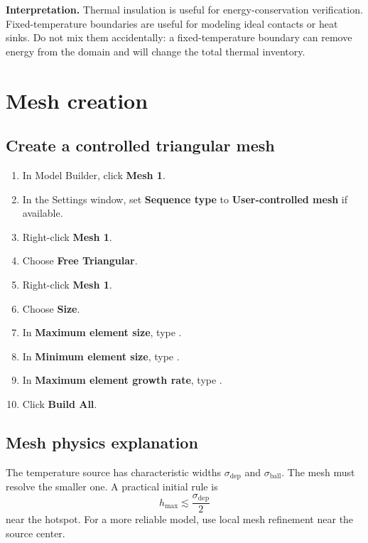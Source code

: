 \documentclass[11pt]{article}
\newcommand{\type}[1]{\texttt{\detokenize{#1}}}
\newcommand{\menu}[1]{\textbf{#1}}
\begin{document}
\begin{notebox}
\textbf{Interpretation.} Thermal insulation is useful for energy-conservation verification.  Fixed-temperature boundaries are useful for modeling ideal contacts or heat sinks.  Do not mix them accidentally: a fixed-temperature boundary can remove energy from the domain and will change the total thermal inventory.
\end{notebox}

\section{Mesh creation}

\subsection{Create a controlled triangular mesh}
\begin{enumerate}
\item In Model Builder, click \menu{Mesh 1}.
\item In the Settings window, set \menu{Sequence type} to \menu{User-controlled mesh} if available.
\item Right-click \menu{Mesh 1}.
\item Choose \menu{Free Triangular}.
\item Right-click \menu{Mesh 1}.
\item Choose \menu{Size}.
\item In \menu{Maximum element size}, type \type{hmax}.
\item In \menu{Minimum element size}, type \type{hmax/5}.
\item In \menu{Maximum element growth rate}, type \type{1.25}.
\item Click \menu{Build All}.
\end{enumerate}

\subsection{Mesh physics explanation}
The temperature source has characteristic widths \(\sigma_{\mathrm{dep}}\) and \(\sigma_{\mathrm{ball}}\).  The mesh must resolve the smaller one.  A practical initial rule is
\begin{equation}
h_{\max}\lesssim \frac{\sigma_{\mathrm{dep}}}{2}
\end{equation}
near the hotspot.  For a more reliable model, use local mesh refinement near the source center.
\end{document}
